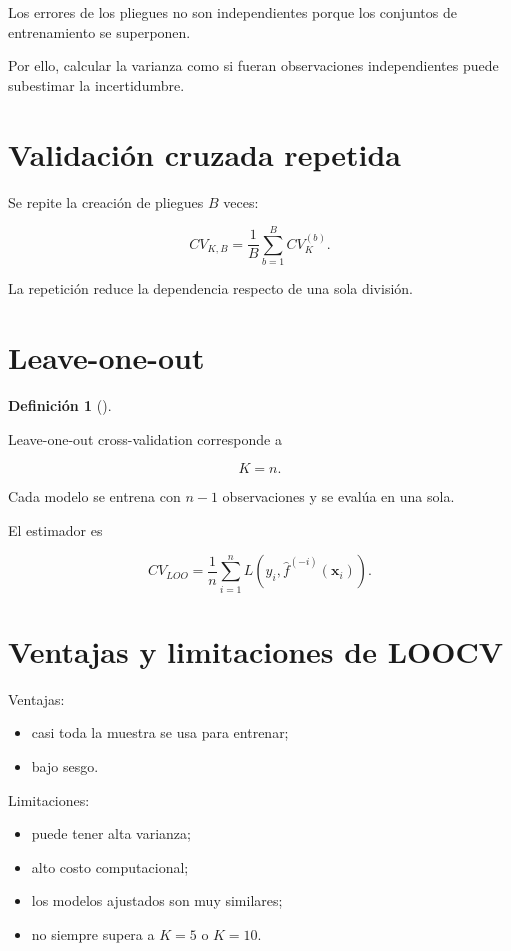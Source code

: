 \documentclass[
  spanish,
  11pt,
  letterpaper,
  DIV=11,
  numbers=noendperiod]{scrreprt}
\providecommand{\tightlist}{%
  \setlength{\itemsep}{0pt}\setlength{\parskip}{0pt}}
\theoremstyle{definition}
\newtheorem{definition}{Definición}[chapter]
\theoremstyle{plain}
\theoremstyle{definition}
\theoremstyle{remark}
\begin{document}
Los errores de los pliegues no son independientes porque los conjuntos
de entrenamiento se superponen.

Por ello, calcular la varianza como si fueran observaciones
independientes puede subestimar la incertidumbre.

\section{Validación cruzada
repetida}\label{validaciuxf3n-cruzada-repetida}

Se repite la creación de pliegues \(B\) veces:

\[
CV_{K,B}
=
\frac{1}{B}
\sum_{b=1}^{B}
CV_K^{(b)}.
\]

La repetición reduce la dependencia respecto de una sola división.

\section{Leave-one-out}\label{leave-one-out}

\begin{definition}[]\protect\hypertarget{def-loocv}{}\label{def-loocv}

Leave-one-out cross-validation corresponde a

\[
K=n.
\]

\end{definition}

Cada modelo se entrena con \(n-1\) observaciones y se evalúa en una
sola.

El estimador es

\[
CV_{LOO}
=
\frac{1}{n}
\sum_{i=1}^{n}
L
\left(
y_i,
\widehat{f}^{(-i)}(\mathbf{x}_i)
\right).
\]

\section{Ventajas y limitaciones de
LOOCV}\label{ventajas-y-limitaciones-de-loocv}

Ventajas:

\begin{itemize}
\tightlist
\item
  casi toda la muestra se usa para entrenar;
\item
  bajo sesgo.
\end{itemize}

Limitaciones:

\begin{itemize}
\tightlist
\item
  puede tener alta varianza;
\item
  alto costo computacional;
\item
  los modelos ajustados son muy similares;
\item
  no siempre supera a \(K=5\) o \(K=10\).
\end{itemize}
\end{document}

